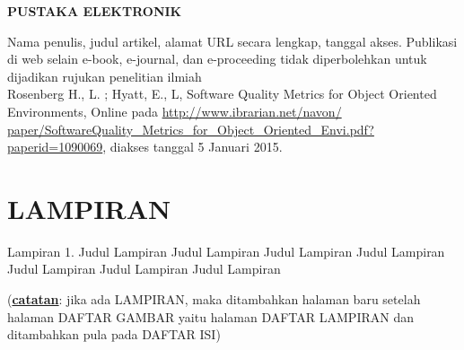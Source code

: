 \documentclass[oneside,listof=totoc]{scrbook}
\begin{document}
\begin{singlespace}
\noindent\textbf{PUSTAKA ELEKTRONIK}\\

\begin{hangparas}{25pt}{1}
Nama penulis, judul artikel, alamat URL secara lengkap, tanggal akses.  Publikasi di web selain e-book, e-journal, dan e-proceeding tidak diperbolehkan untuk dijadikan rujukan penelitian ilmiah\\

Rosenberg H., L. ; Hyatt, E., L, Software Quality Metrics for Object              Oriented Environments, Online pada \url{http://www.ibrarian.net/navon/ paper/SoftwareQuality_Metrics_for_Object_Oriented_Envi.pdf?paperid=1090069}, diakses tanggal 5 Januari 2015.\\
\end{hangparas}

\end{singlespace}

\chapter{LAMPIRAN}

\vspace{0.5cm}

\begin{singlespace}
\begin{hangparas}{58pt}{1}
Lampiran 1. 	Judul Lampiran Judul Lampiran Judul Lampiran Judul Lampiran Judul Lampiran Judul Lampiran Judul Lampiran
\end{hangparas}

\vspace{0.5cm}

\noindent (\textbf{\underline{catatan}}: jika ada LAMPIRAN, maka ditambahkan halaman baru setelah halaman DAFTAR GAMBAR yaitu halaman DAFTAR LAMPIRAN dan ditambahkan pula pada DAFTAR ISI)
\end{singlespace}
\end{document}
